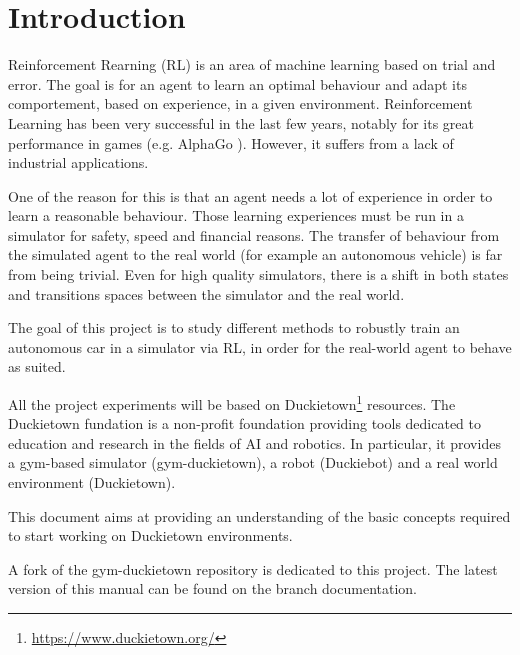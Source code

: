 \chapter*{Introduction}

Reinforcement Rearning (RL) is an area of machine learning based on trial and error.
The goal is for an agent to learn an optimal behaviour and adapt its comportement, based on experience, in a given environment.
Reinforcement Learning has been very successful in the last few years, notably for its great performance in games (e.g. AlphaGo \cite{rlgames}).
However, it suffers from a lack of industrial applications.

One of the reason for this is that an agent needs a lot of experience in order to learn a reasonable behaviour.
Those learning experiences must be run in a simulator for safety, speed and financial reasons.
The transfer of behaviour from the simulated agent to the real world (for example an autonomous vehicle) is far from being trivial.
Even for high quality simulators, there is a shift in both states and transitions spaces between the simulator and the real world.

The goal of this project is to study different methods to robustly train an autonomous car in a simulator via RL, in order for the real-world agent to behave as suited.

All the project experiments will be based on Duckietown\footnote{\url{https://www.duckietown.org/}} resources.
The Duckietown fundation is a non-profit foundation providing tools dedicated to education and research in the fields of AI and robotics.
In particular, it provides a gym-based simulator (gym-duckietown), a robot (Duckiebot) and a real world environment (Duckietown).

This document aims at providing an understanding of the basic concepts required to start working on Duckietown environments.


A fork of the gym-duckietown repository\cite{gym_duckietown} is dedicated to this project\cite{forked_gym_duckietown}.
The latest version of this manual can be found on the branch documentation.
